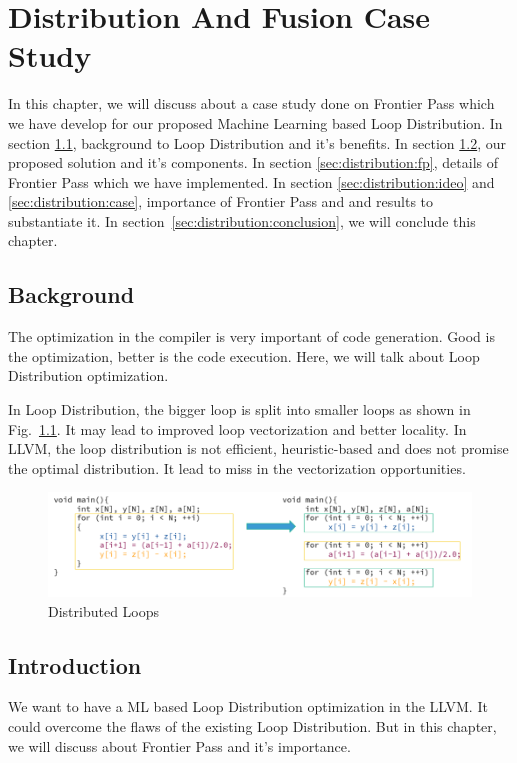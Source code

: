\chapter{Distribution And Fusion Case Study}
\label{chap:ch4}

In this chapter, we will discuss about a case study done on Frontier Pass which we have develop for our proposed Machine Learning based Loop Distribution. In section \ref{sec:distribution:bg}, background to Loop Distribution and it's benefits. In section \ref{sec:distribution:intro}, our proposed solution and it's components. In section \ref{sec:distribution:fp}, details of Frontier Pass which we have implemented. In section \ref{sec:distribution:ideo} and \ref{sec:distribution:case}, importance of  Frontier Pass and and results to substantiate it. In section~\ref{sec:distribution:conclusion}, we will conclude this chapter.


\section{Background}\label{sec:distribution:bg}
    The optimization in the compiler is very important of code generation.
Good is the optimization, better is the code execution. Here, we will talk about Loop Distribution optimization.

    In Loop Distribution, the bigger loop is split into smaller loops as shown in Fig.~\ref{fig:dist-introduction}. It may lead to improved loop vectorization and better locality. In LLVM, the loop distribution is not efficient, heuristic-based and does not promise the optimal distribution. It lead to miss in the vectorization opportunities.

\begin{figure}[t]
    \centering
    \includegraphics[scale=0.45]{figures/chapter-4/distribution_introduction.png}
    \caption{Distributed Loops}
     \label{fig:dist-introduction}
\end{figure}

\section{Introduction}\label{sec:distribution:intro}
We want to have a ML based Loop Distribution optimization in the LLVM. It could overcome the flaws of the existing Loop Distribution. But in this chapter, we will discuss about Frontier Pass and it's importance.

